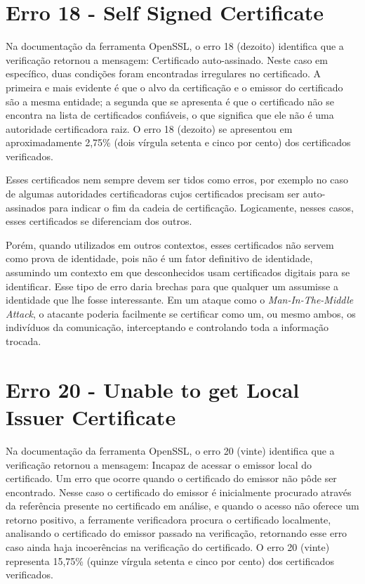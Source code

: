 \section[Erro 18 - Self Signed Certificate]{Erro 18 - Self Signed Certificate}

	Na documentação da ferramenta OpenSSL, o erro 18 (dezoito) identifica que a verificação retornou a mensagem: Certificado auto-assinado.
	Neste caso em específico, duas condições foram encontradas irregulares no certificado. A primeira e mais evidente é que o alvo da certificação e o emissor do certificado são a mesma entidade; a segunda que se apresenta é que o certificado não se encontra na lista de certificados confiáveis, o que significa que ele não é uma autoridade certificadora raiz.
	O erro 18 (dezoito) se apresentou em aproximadamente 2,75\% (dois vírgula setenta e cinco por cento) dos certificados verificados.
	
	Esses certificados nem sempre devem ser tidos como erros, por exemplo no caso de algumas autoridades certificadoras cujos certificados precisam ser auto-assinados para indicar o fim da cadeia de certificação. Logicamente, nesses casos, esses certificados se diferenciam dos outros.

	Porém, quando utilizados em outros contextos, esses certificados não servem como prova de identidade, pois não é um fator definitivo de identidade, assumindo um contexto em que desconhecidos usam certificados digitais para se identificar. Esse tipo de erro daria brechas para que qualquer um assumisse a identidade que lhe fosse interessante. Em um ataque como o \textit{Man-In-The-Middle Attack}, o atacante poderia facilmente se certificar como um, ou mesmo ambos, os indivíduos da comunicação, interceptando e controlando toda a informação trocada.

\section[Erro 20 - Unable to get Local Issuer Certificate]{Erro 20 - Unable to get Local Issuer Certificate}

	Na documentação da ferramenta OpenSSL, o erro 20 (vinte) identifica que a verificação retornou a mensagem: Incapaz de acessar o emissor local do certificado.
	Um erro que ocorre quando o certificado do emissor não pôde ser encontrado. Nesse caso o certificado do emissor é inicialmente procurado através da referência presente no certificado em análise, e quando o acesso não oferece um retorno positivo, a ferramente verificadora procura o certificado localmente, analisando o certificado do emissor passado na verificação, retornando esse erro caso ainda haja incoerências na verificação do certificado.
	O erro 20 (vinte) representa 15,75\% (quinze vírgula setenta e cinco por cento) dos certificados verificados.

